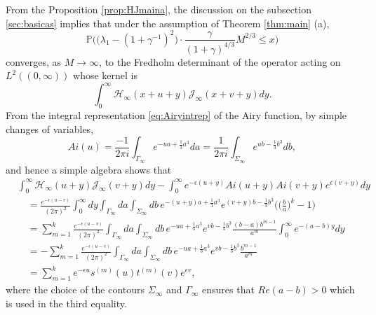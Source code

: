 \documentclass[11pt]{article}
\begin{document}
From the Proposition \ref{prop:HJmaina}, the discussion on the
subsection \ref{sec:basicas} implies that under the assumption of
Theorem \ref{thm:main} (a),
\begin{equation}\label{eq:Proofatemp}
  \mathbb{P} \biggl( \bigr( \lambda_1 - (1+\gamma^{-1})^2 \bigr) \cdot
  \frac{\gamma}{(1+\gamma)^{4/3}} M^{2/3} \le x \biggr)
\end{equation}
converges, as $M\to\infty$, to the Fredholm determinant of the
operator acting on $L^2((0,\infty))$ whose kernel is
\begin{equation}
  \int_0^\infty
  \mathcal{H}_\infty(x+u+y)\mathcal{J}_\infty(x+v+y)dy.
\end{equation}
From the integral representation \eqref{eq:Airyintrep} of the Airy
function, by simple changes of variables,
\begin{equation}
  Ai(u) = \frac{-1}{2\pi i} \int_{\Gamma_\infty} e^{-ua +\frac13 a^3} da
= \frac1{2\pi i} \int_{\Sigma_\infty} e^{ub - \frac13 b^3} db,
\end{equation}
and hence a simple algebra shows that
\begin{equation}\label{eq:KinAste}
\begin{split}
  &  \int_0^\infty
  \mathcal{H}_\infty(u+y)\mathcal{J}_\infty(v+y)dy-
  \int_0^\infty
  e^{-\epsilon (u+y)}Ai(u+y) Ai(v+y) e^{\epsilon (v+y)} dy \\
  &\quad = \frac{e^{-\epsilon (u-v)}}{(2\pi)^2} \int_0^\infty dy
  \int_{\Gamma_\infty} da
  \int_{\Sigma_\infty} db \,
  e^{-(u+y)a+\frac13a^3} e^{(v+y)b-\frac13b^3}
  \biggl(\biggl(\frac{b}{a}\biggr)^k -1\biggr) \\
  &\quad
  = \sum_{m=1}^{k} \frac{e^{-\epsilon (u-v)}}{(2\pi)^2}
  \int_{\Gamma_\infty} da
  \int_{\Sigma_\infty} db \,
  e^{-ua+\frac13a^3} e^{vb-\frac13b^3}
  \frac{(b-a)b^{m-1}}{a^{m}} \int_0^\infty
  e^{-(a-b)y} dy \\
  &\quad
  = -\sum_{m=1}^{k} \frac{e^{-\epsilon (u-v)}}{(2\pi)^2}
  \int_{\Gamma_\infty} da
  \int_{\Sigma_\infty} db \,
  e^{-ua+\frac13a^3} e^{vb-\frac13b^3} \frac{b^{m-1}}{a^m} \\
  &\quad
  = \sum_{m=1}^{k} e^{-\epsilon u}s^{(m)}(u)t^{(m)}(v) e^{\epsilon v},
\end{split}
\end{equation}
where the choice of the contours $\Sigma_\infty$ and $\Gamma_\infty$
ensures that $Re(a-b)>0$ which is used in the third equality.
\end{document}
